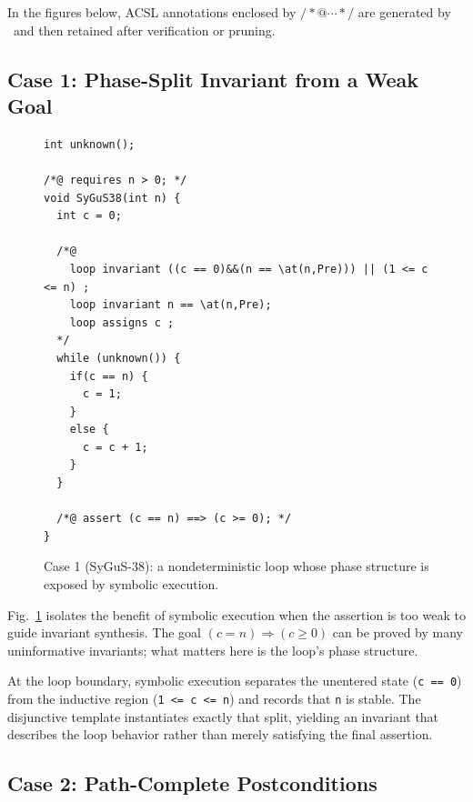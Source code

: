 In the figures below, ACSL annotations enclosed by $/*@\cdots */$ are generated by \toolname\ and then retained after verification or pruning.



\subsection{Case 1: Phase-Split Invariant from a Weak Goal}

\begin{figure}[!t]
    \centering
    \begin{tcolorbox}[casebox, title={Case 1: symbolic state exposes loop phases}]
\begin{lstlisting}[style=caseinnerstyle]
int unknown();

/*@ requires n > 0; */
void SyGuS38(int n) {
  int c = 0;

  /*@
    loop invariant ((c == 0)&&(n == \at(n,Pre))) || (1 <= c <= n) ;
    loop invariant n == \at(n,Pre);
    loop assigns c ;
  */
  while (unknown()) {
    if(c == n) {
      c = 1;
    }
    else {
      c = c + 1;
    }
  }

  /*@ assert (c == n) ==> (c >= 0); */
}
\end{lstlisting}
    \end{tcolorbox}
    \caption{Case 1 (SyGuS-38): a nondeterministic loop whose phase structure is exposed by symbolic execution.}
    \label{fig:case1}
\end{figure}

Fig.~\ref{fig:case1} isolates the benefit of symbolic execution when the assertion is too weak to guide invariant synthesis. The goal $(c = n) \Rightarrow (c \ge 0)$ can be proved by many uninformative invariants; what matters here is the loop's phase structure.

At the loop boundary, symbolic execution separates the unentered state (\texttt{c == 0}) from the inductive region (\texttt{1 <= c <= n}) and records that \texttt{n} is stable. The disjunctive template instantiates exactly that split, yielding an invariant that describes the loop behavior rather than merely satisfying the final assertion.

\subsection{Case 2: Path-Complete Postconditions }

